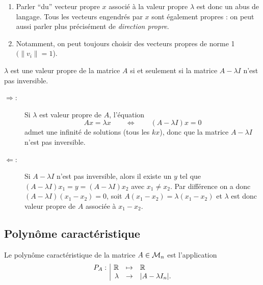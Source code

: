\remarks
\begin{enumerate}
  \item Parler ``du'' vecteur propre $x$ associé à la valeur propre $\lambda$ est donc un abus de langage. Tous les vecteurs engendrés par $x$ sont également propres : on peut aussi parler plus précisément de {\em direction propre}. 
  \item Notamment, on peut toujours choisir des vecteurs propres de norme 1 $(\|v_i\| = 1$). 
\end{enumerate}

\begin{proposition} \label{prop:A-lambdaI_NonInversible}
  $\lambda$ est une valeur propre de la matrice $A$ si et seulement si la matrice $A - \lambda I$ n'est pas inversible.
\end{proposition}

\proof
\begin{description}
 \item[$\Rightarrow$:] Si $\lambda$ est valeur propre de $A$, l'équation
  \begin{equation} \label{eq:RqValeurPropre}
    Ax = \lambda x \qquad \Leftrightarrow \qquad (A - \lambda I)x = 0
  \end{equation}
  admet une infinité de solutions (tous les $kx$), donc que la matrice $A - \lambda I$ n'est pas inversible.
  \item[$\Leftarrow$:] Si $A - \lambda I$ n'est pas inversible, alors il existe un $y$ tel que $(A  - \lambda I)x_1 = y = (A - \lambda I)x_2$ avec $x_1 \neq x_2$. Par différence on a donc $(A  - \lambda I)(x_1 - x_2) = 0$, soit $A(x_1 - x_2) = \lambda(x_1 - x_2)$ et $\lambda$ est donc valeur propre de $A$ associée à $x_1 - x_2$.
\end{description}
\eproof

\subsection{Polynôme caractéristique} \label{sec:polCarac}

\begin{definition}
  Le polynôme caractéristique de la matrice $A \in \mathcal{M}_n$ est l'application 
  $$
  \begin{array}{r|rcl}
   P_A: & \mathbb{R} & \mapsto & \mathbb{R} \\
    & \lambda & \to & |A - \lambda I_n|.
  \end{array}
  $$
\end{definition}

